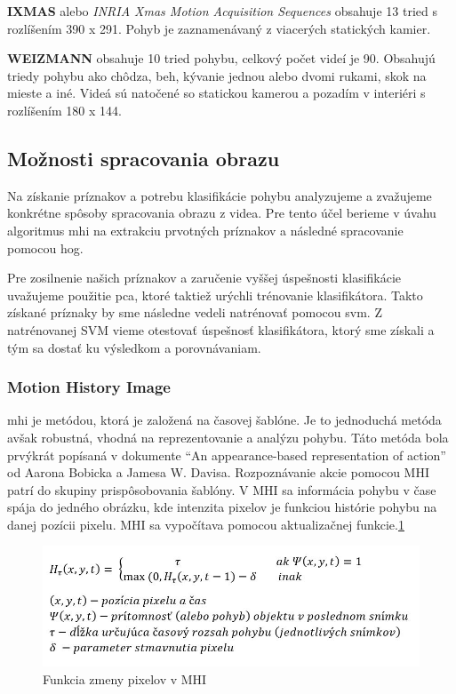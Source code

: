 \textbf{IXMAS} alebo \textit{INRIA Xmas Motion Acquisition Sequences} obsahuje 13 tried s rozlíšením 390 x 291. Pohyb je zaznamenávaný z viacerých statických kamier. \cite{c1}

\textbf{WEIZMANN} obsahuje 10 tried pohybu, celkový počet videí je 90. Obsahujú triedy pohybu ako chôdza, beh, kývanie jednou alebo dvomi rukami, skok na mieste a iné. Videá sú natočené so statickou kamerou a pozadím  v interiéri  s rozlíšením 180 x 144. \cite{c1}

\subsection{Možnosti spracovania obrazu}
Na získanie príznakov a potrebu klasifikácie pohybu analyzujeme a zvažujeme konkrétne spôsoby spracovania obrazu z videa. Pre tento účel berieme v úvahu algoritmus \acrfull{mhi} na extrakciu prvotných príznakov a následné spracovanie pomocou \acrfull{hog}. 

Pre zosilnenie našich príznakov a zaručenie vyššej úspešnosti klasifikácie uvažujeme použitie \acrfull{pca}, ktoré taktiež urýchli trénovanie klasifikátora. Takto získané príznaky by sme následne vedeli natrénovať pomocou \acrfull{svm}. Z natrénovanej SVM vieme otestovať úspešnosť klasifikátora, ktorý sme získali a tým sa dostať ku výsledkom a porovnávaniam. 

\subsubsection{Motion History Image} \label{MHIlabel}
\acrshort{mhi} je metódou, ktorá je založená na časovej šablóne. Je to jednoduchá metóda avšak robustná, vhodná na reprezentovanie a analýzu pohybu.\cite{c3}  Táto metóda bola prvýkrát popísaná v dokumente ``An appearance-based representation of action'' od Aarona Bobicka a Jamesa W. Davisa.\cite{c2} Rozpoznávanie akcie pomocou MHI patrí do skupiny prispôsobovania šablóny. V MHI sa informácia pohybu v čase spája do jedného obrázku, kde intenzita pixelov je funkciou histórie pohybu na danej pozícii pixelu. MHI sa vypočítava pomocou aktualizačnej funkcie.\ref{MHIeq}


\begin{figure}[H]
  \centering
  \includegraphics[width=14cm]{img/MHIeq.jpg}
  \caption{Funkcia zmeny pixelov v MHI}
  \label{MHIeq}
\end{figure}

